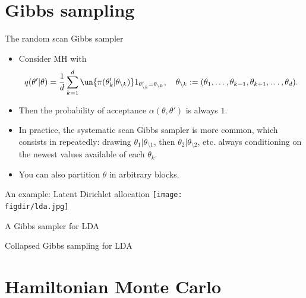\documentclass[10pt]{beamer}
\def\figdir{Figures}
\begin{document}
\section{Gibbs sampling}
\begin{frame}{The random scan Gibbs sampler}
\begin{itemize}
\item Consider MH with
$$
q(\theta'\vert\theta) = \frac1d \sum_{k=1}^d \un{\pi(\theta'_k\vert \theta_{\setminus k})} 1_{\theta'_{\setminus k} = \theta_{\setminus k}}, \quad \theta_{\setminus k}:= (\theta_1,\dots,\theta_{k-1},\theta_{k+1},\dots,\theta_d).
$$
\item Then the probability of acceptance $\alpha(\theta,\theta')$ is always $1$.
\vspace{2cm}
\vfill
\item In practice, the systematic scan Gibbs sampler is more common, which consists in repeatedly: drawing $\theta_1\vert\theta_{\setminus 1}$, then $\theta_2\vert\theta_{\setminus 2}$, etc. always conditioning on the newest values available of each $\theta_k$.
\item You can also partition $\theta$ in arbitrary blocks.
\end{itemize}
\end{frame}

\begin{frame}{An example: Latent Dirichlet allocation}
\centering
\texttt{[image: \\figdir/lda.jpg]}
\vfill
\end{frame}

\begin{frame}{A Gibbs sampler for LDA}

\end{frame}

\begin{frame}{Collapsed Gibbs sampling for LDA}

\end{frame}

\section{Hamiltonian Monte Carlo}
\end{document}
